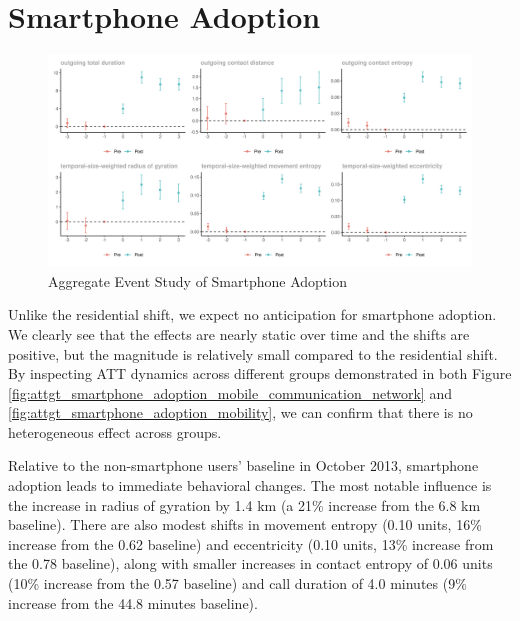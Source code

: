 
\clearpage\newpage
\section{Smartphone Adoption}
\begin{figure}[h!]
\centering
\caption{Aggregate Event Study of Smartphone Adoption}
\vspace{0.1cm}

\includegraphics[scale=0.49]{figures/csdid/smartphone_adoption.png}

\label{fig:event_study_smartphone_adoption}
\end{figure}

Unlike the residential shift, we expect no anticipation for smartphone adoption.
We clearly see that the effects are nearly static over time and the shifts are positive, but the magnitude is relatively small compared to the residential shift.
By inspecting ATT dynamics across different groups demonstrated in both Figure \ref{fig:attgt_smartphone_adoption_mobile_communication_network} and \ref{fig:attgt_smartphone_adoption_mobility}, we can confirm that there is no heterogeneous effect across groups.

Relative to the non-smartphone users' baseline in October 2013, smartphone adoption leads to immediate behavioral changes.
The most notable influence is the increase in radius of gyration by 1.4 km (a 21\% increase from the 6.8 km baseline).
There are also modest shifts in movement entropy (0.10 units, 16\% increase from the 0.62 baseline) and eccentricity (0.10 units, 13\% increase from the 0.78 baseline), along with smaller increases in contact entropy of 0.06 units (10\% increase from the 0.57 baseline) and call duration of 4.0 minutes (9\% increase from the 44.8 minutes baseline).

